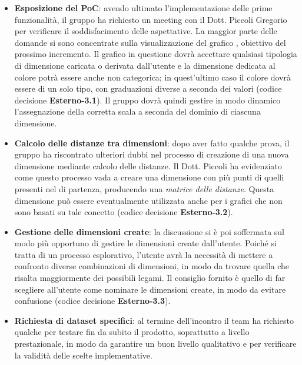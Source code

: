 \begin{itemize}

\item \textbf{Esposizione del PoC}: avendo ultimato l'implementazione delle prime funzionalità, il gruppo ha richiesto un meeting con il Dott. Piccoli Gregorio per verificare il soddisfacimento delle aspettative. La maggior parte delle domande si sono concentrate sulla visualizzazione del grafico \textit{}, obiettivo del prossimo incremento. Il grafico in questione dovrà accettare qualsiasi tipologia di dimensione caricata o derivata dall'utente e la dimensione dedicata al colore potrà essere anche non categorica; in quest'ultimo caso il colore dovrà essere di un solo tipo, con graduazioni diverse a seconda dei valori (codice decisione \textbf{Esterno-3.1}). Il gruppo dovrà quindi gestire in modo dinamico l'assegnazione della corretta scala a seconda del dominio di ciascuna dimensione.

\item \textbf{Calcolo delle distanze tra dimensioni}: dopo aver fatto qualche prova, il gruppo ha riscontrato ulteriori dubbi nel processo di creazione di una nuova dimensione mediante calcolo delle distanze. Il Dott. Piccoli ha evidenziato come questo processo vada a creare una dimensione con più punti di quelli presenti nel  di partenza, producendo una \textit{matrice delle distanze}. Questa dimensione può essere eventualmente utilizzata anche per i grafici che non sono basati su tale concetto (codice decisione \textbf{Esterno-3.2}).

\item \textbf{Gestione delle dimensioni create}: la discussione si è poi soffermata sul modo più opportuno di gestire le dimensioni create dall'utente. Poiché si tratta di un processo esplorativo, l'utente avrà la necessità di mettere a confronto diverse combinazioni di dimensioni, in modo da trovare quella che risalta maggiormente dei possibili legami. Il consiglio fornito è quello di far scegliere all'utente come nominare le dimensioni create, in modo da evitare confusione (codice decisione \textbf{Esterno-3.3}).

\item \textbf{Richiesta di dataset specifici}: al termine dell'incontro il team ha richiesto qualche  per testare fin da subito il prodotto, soprattutto a livello prestazionale, in modo da garantire un buon livello qualitativo e per verificare la validità delle scelte implementative.  

\end{itemize}